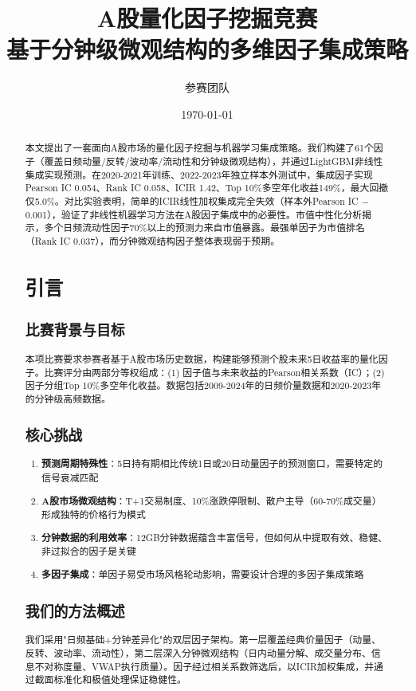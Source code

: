 \documentclass[12pt,a4paper]{article}
\title{\textbf{A股量化因子挖掘竞赛}\\{\large 基于分钟级微观结构的多维因子集成策略}}
\author{参赛团队}
\date{\today}
\begin{document}
\maketitle

\begin{abstract}
本文提出了一套面向A股市场的量化因子挖掘与机器学习集成策略。我们构建了61个因子（覆盖日频动量/反转/波动率/流动性和分钟级微观结构），并通过LightGBM非线性集成实现预测。在2020-2021年训练、2022-2023年独立样本外测试中，集成因子实现Pearson IC 0.054、Rank IC 0.058、ICIR 1.42、Top 10\%多空年化收益149\%，最大回撤仅5.0\%。对比实验表明，简单的ICIR线性加权集成完全失效（样本外Pearson IC $-$0.001），验证了非线性机器学习方法在A股因子集成中的必要性。市值中性化分析揭示，多个日频流动性因子70\%以上的预测力来自市值暴露。最强单因子为市值排名（Rank IC 0.037），而分钟微观结构因子整体表现弱于预期。

\section{引言}

\subsection{比赛背景与目标}
本项比赛要求参赛者基于A股市场历史数据，构建能够预测个股未来5日收益率的量化因子。比赛评分由两部分等权组成：(1) 因子值与未来收益的Pearson相关系数（IC）；(2) 因子分组Top 10\%多空年化收益。数据包括2009-2024年的日频价量数据和2020-2023年的分钟级高频数据。

\subsection{核心挑战}
\begin{enumerate}[label=(\arabic*)]
    \item \textbf{预测周期特殊性}：5日持有期相比传统1日或20日动量因子的预测窗口，需要特定的信号衰减匹配
    \item \textbf{A股市场微观结构}：T+1交易制度、10\%涨跌停限制、散户主导（60-70\%成交量）形成独特的价格行为模式
    \item \textbf{分钟数据的利用效率}：12GB分钟数据蕴含丰富信号，但如何从中提取有效、稳健、非过拟合的因子是关键
    \item \textbf{多因子集成}：单因子易受市场风格轮动影响，需要设计合理的多因子集成策略
\end{enumerate}

\subsection{我们的方法概述}
我们采用"日频基础+分钟差异化"的双层因子架构。第一层覆盖经典价量因子（动量、反转、波动率、流动性），第二层深入分钟微观结构（日内动量分解、成交量分布、信息不对称度量、VWAP执行质量）。因子经过相关系数筛选后，以ICIR加权集成，并通过截面标准化和极值处理保证稳健性。


\end{abstract}
\end{document}
